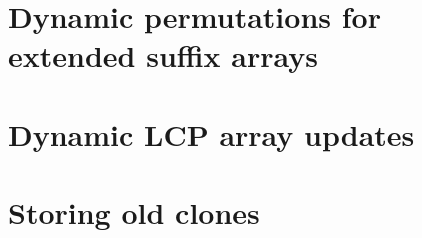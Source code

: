 

\section{Dynamic permutations for extended suffix arrays}

\section{Dynamic LCP array updates}

\section{Storing old clones}
